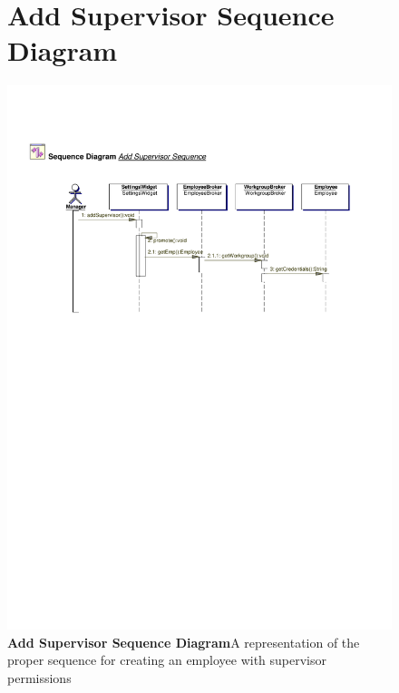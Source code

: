 \documentclass[letterpaper,12pt]{report}
\begin{document}
\begin{figure}[hbp]
 \section{Add Supervisor Sequence Diagram}
 \includegraphics[scale=0.65]{externals/SequenceDiagrams2.pdf}
 \caption{\small
\textbf{Add Supervisor Sequence Diagram}\newline A representation of the proper sequence for creating an employee with supervisor permissions}\label{fig:seqAddSupervisor}
\end{figure}
\newpage
\end{document}
